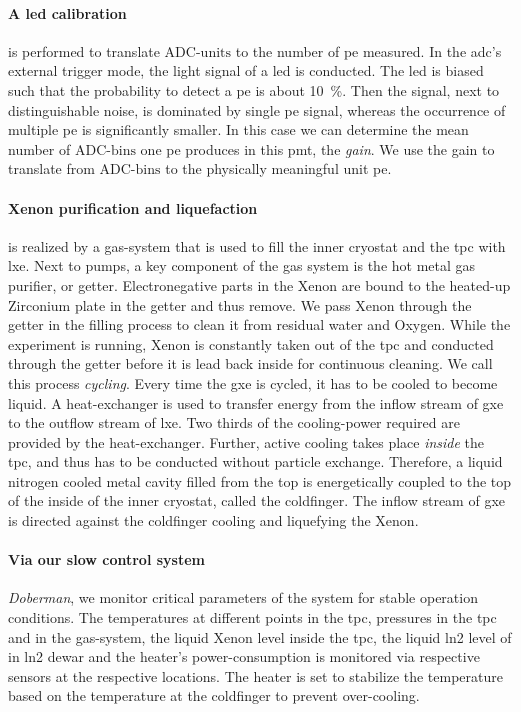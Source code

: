 \paragraph{A \gls{led} calibration} is performed to translate $ \mathrm{ADC\mbox{-}units} $ to the number of \gls{pe} measured.
In the \gls{adc}'s external trigger mode, the light signal of a \gls{led} is conducted.
The \gls{led} is biased such that the probability to detect a \gls{pe} is about \SI{10}{\%}.
Then the signal, next to distinguishable noise, is dominated by single \gls{pe} signal, whereas the occurrence of multiple \gls{pe} is significantly smaller.
In this case we can determine the mean number of $ \mathrm{ADC\mbox{-}bins} $ one \gls{pe} produces in this \gls{pmt}, the \emph{gain}.
We use the gain to translate from $ \mathrm{ADC\mbox{-}bins} $ to the physically meaningful unit \gls{pe}.



\paragraph{Xenon purification and liquefaction} is realized by a gas-system that is used to fill the inner cryostat and the \gls{tpc} with \gls{lxe}.
Next to pumps, a key component of the gas system is the hot metal gas purifier, or getter.
Electronegative parts in the Xenon are bound to the heated-up Zirconium plate in the getter and thus remove.
We pass Xenon through the getter in the filling process to clean it from residual water and Oxygen.
While the experiment is running, Xenon is constantly taken out of the \gls{tpc} and conducted through the getter before it is lead back inside for continuous cleaning.
We call this process \emph{cycling}.
Every time the \gls{gxe} is cycled, it has to be cooled to become liquid.
A heat-exchanger is used to transfer energy from the inflow stream of \gls{gxe} to the outflow stream of \gls{lxe}.
Two thirds of the cooling-power required are provided by the heat-exchanger.
Further, active cooling takes place \emph{inside} the \gls{tpc}, and thus has to be conducted without particle exchange.
Therefore, a liquid nitrogen cooled metal cavity filled from the top is energetically coupled to the top of the inside of the inner cryostat, called the coldfinger.  %
The inflow stream of \gls{gxe} is directed against the coldfinger cooling and liquefying the Xenon.


\paragraph{Via our slow control system} \emph{Doberman}, we monitor critical parameters of the system for stable operation conditions.
The temperatures at different points in the \gls{tpc}, pressures in the \gls{tpc} and in the gas-system, the liquid Xenon level inside the \gls{tpc}, the liquid \gls{ln2} level of in \gls{ln2} dewar and the heater's power-consumption is monitored via respective sensors at the respective locations.
The heater is set to stabilize the temperature based on the temperature at the coldfinger to prevent over-cooling.



